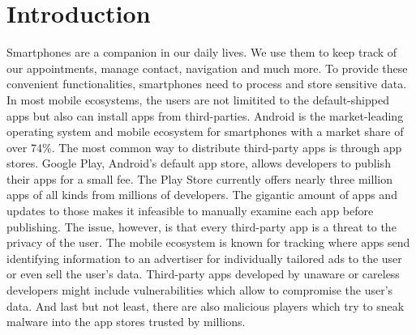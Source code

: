 \documentclass[../draft.tex]{subfiles}
\begin{document}
    \chapter{Introduction}
    Smartphones are a companion in our daily lives.
    We use them to keep track of our appointments, manage contact, navigation and much more.
    To provide these convenient functionalities, smartphones need to process and store sensitive data.
    In most mobile ecosystems, the users are not limitited to the default-shipped apps but also can install apps from third-parties.
    Android is the market-leading operating system and mobile ecosystem for smartphones with a market share of over 74\%.
    The most common way to distribute third-party apps is through app stores.
    Google Play, Android's default app store, allows developers to publish their apps for a small fee.
    The Play Store currently offers nearly three million apps of all kinds from millions of developers.
    The gigantic amount of apps and updates to those makes it infeasible to manually examine each app before publishing.
    The issue, however, is that every third-party app is a threat to the privacy of the user.
    The mobile ecosystem is known for tracking where apps send identifying information to an advertiser for individually tailored ads to the user or even sell the user's data.
    Third-party apps developed by unaware or careless developers might include vulnerabilities which allow to compromise the user's data.
    And last but not least, there are also malicious players which try to sneak malware into the app stores trusted by millions.
    
\end{document}

